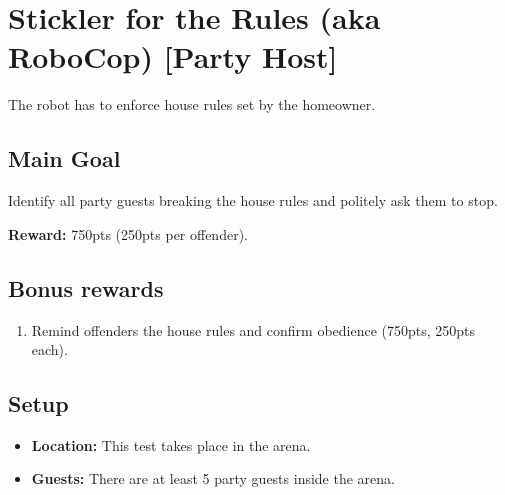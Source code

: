\section{Stickler for the Rules (aka RoboCop) [Party Host]}
\label{test:stickler-for-the-rules}
The robot has to enforce house rules set by the homeowner.


\subsection*{Main Goal}
Identify all party guests breaking the house rules and politely ask them to stop.

\noindent\textbf{Reward:} 750pts (250pts per offender).

\subsection*{Bonus rewards}
\begin{enumerate}[nosep]
	\item Remind offenders the house rules and confirm obedience (750pts, 250pts each).
\end{enumerate}

\subsection*{Setup}
\begin{itemize}[nosep]
	\item \textbf{Location:} This test takes place in the arena.
	\item \textbf{Guests:} There are at least 5 party guests inside the arena.
\end{itemize}


